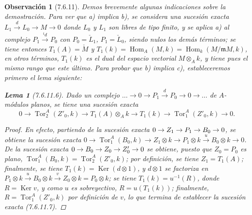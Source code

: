 \documentclass[10pt,oneside,openany]{book}
\theoremstyle{egaenv}\newtheorem*{env}{---}
\theoremstyle{egastatement}
\newtheorem*{lemma}{Lema}
\theoremstyle{egadescription}
\newtheorem*{remark}{Observación}
\newcommand{\oldpage}[2][]{\marginnote{\normalfont\scriptsize\textbf{#1}\,|\,#2}\ignorespaces}
\renewcommand{\to}{\mathchoice{\longrightarrow}{\rightarrow}{\rightarrow}{\rightarrow}}
\begin{document}
\begin{remark}[7.6.11]
Demos brevemente algunas indicaciones sobre la demostración. Para ver que \emph{a)}
implica \emph{b)}, se considera una sucesión exacta
$L_1\xrightarrow{d}L_0\longrightarrow M\longrightarrow0$
donde $L_0$ y $L_1$ son libres de tipo finito, y se aplica \emph{a)} al complejo
$P_1\xrightarrow{{}^t d}P_0$ con $P_0=\check L_1$, $P_1=\check L_0$,
siendo nulos los demás términos; se tiene entonces $T_1(A)=\check M$ y
$T_1(k)=\operatorname{Hom}_A(M,k)=\operatorname{Hom}_k(M/\mathfrak mM,k)$,
en otros términos, $T_1(k)$ es el dual del espacio vectorial $M\otimes_A k$, y tiene
pues el mismo rango que este último. Para probar que \emph{b)} implica \emph{c)}, estableceremos
primero el lema siguiente:

\begin{lemma}[7.6.11.6]
Dado un complejo
$\ldots\longrightarrow0\longrightarrow P_1\xrightarrow{d}P_0\longrightarrow0\longrightarrow\ldots$
de $A$-módulos planos, se tiene una sucesión exacta
\[
  0\longrightarrow\operatorname{Tor}_2^A(Z'_0,k)
  \longrightarrow T_1(A)\otimes_A k
  \longrightarrow T_1(k)
  \longrightarrow\operatorname{Tor}_1^A(Z'_0,k)
  \longrightarrow0.
  \tag{7.6.11.7}\label{III.7.6.11.7.fr}
\]
\end{lemma}

\begin{proof}
\oldpage[III]{197}
En efecto, partiendo de la sucesión exacta
$0\to Z_1\to P_1\to B_0\to0$, se obtiene la sucesión exacta
$0\longrightarrow\operatorname{Tor}_1^A(B_0,k)\longrightarrow Z_1\otimes k\longrightarrow P_1\otimes k\xrightarrow{u}B_0\otimes k\longrightarrow0$.
De la sucesión exacta $0\to B_0\to Z_0\to Z'_0\to0$ se obtiene, puesto que $Z_0=P_0$
es plano,
$\operatorname{Tor}_1^A(B_0,k)=\operatorname{Tor}_2^A(Z'_0,k)$; por definición,
se tiene $Z_1=T_1(A)$; finalmente, se tiene $T_1(k)=\operatorname{Ker}(d\otimes1)$, y
$d\otimes1$ se factoriza en
$P_1\otimes k\xrightarrow{u}B_0\otimes k\xrightarrow{v}Z_0\otimes k=P_0\otimes k$;
se tiene $T_1(k)=u^{-1}(R)$, donde $R=\operatorname{Ker}v$, y como $u$ es
sobreyectivo, $R=u(T_1(k))$; finalmente,
$R=\operatorname{Tor}_1^A(Z'_0,k)$ por definición de $v$, lo que termina
de establecer la sucesión exacta (7.6.11.7).
\end{proof}


\end{remark}
\end{document}
